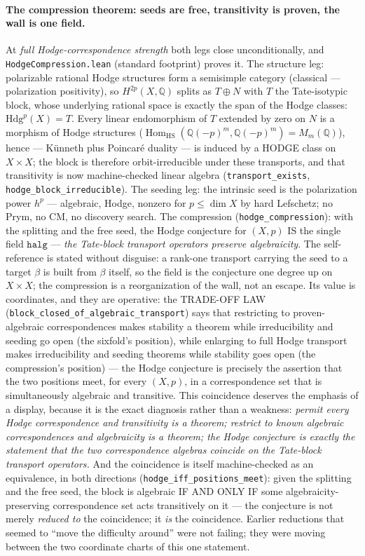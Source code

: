 \documentclass[11pt]{article}
\theoremstyle{definition}
\theoremstyle{remark}
\begin{document}
\paragraph{The compression theorem: seeds are free, transitivity is
proven, the wall is one field.}  At \emph{full Hodge-correspondence
strength} both legs close unconditionally, and
\texttt{HodgeCompression.lean} (standard footprint) proves it.  The
structure leg: polarizable rational Hodge structures form a semisimple
category (classical --- polarization positivity), so
$H^{2p}(X,\mathbb{Q})$ splits as $T\oplus N$ with $T$ the Tate-isotypic
block, whose underlying rational space is exactly the span of the Hodge
classes: $\mathrm{Hdg}^p(X)=T$.  Every linear endomorphism of $T$
extended by zero on $N$ is a morphism of Hodge structures
($\operatorname{Hom}_{\mathrm{HS}}(\mathbb{Q}(-p)^m,\mathbb{Q}(-p)^m)
=M_m(\mathbb{Q})$), hence --- K\"unneth plus Poincar\'e duality --- is
induced by a HODGE class on $X\times X$; the block is therefore
orbit-irreducible under these transports, and that transitivity is now
machine-checked linear algebra (\texttt{transport\_exists},
\texttt{hodge\_block\_irreducible}).  The seeding leg: the intrinsic
seed is the polarization power $h^p$ --- algebraic, Hodge, nonzero for
$p\le\dim X$ by hard Lefschetz; no Prym, no CM, no discovery search.
The compression (\texttt{hodge\_compression}): with the splitting and
the free seed, the Hodge conjecture for $(X,p)$ IS the single field
$\mathtt{halg}$ --- \emph{the Tate-block transport operators preserve
algebraicity}.  The self-reference is stated without disguise: a
rank-one transport carrying the seed to a target $\beta$ is built from
$\beta$ itself, so the field is the conjecture one degree up on
$X\times X$; the compression is a reorganization of the wall, not an
escape.  Its value is coordinates, and they are operative: the
TRADE-OFF LAW (\texttt{block\_closed\_of\_algebraic\_transport})
says that restricting to proven-algebraic correspondences makes
stability a theorem while irreducibility and seeding go open (the
sixfold's position), while enlarging to full Hodge transport makes
irreducibility and seeding theorems while stability goes open (the
compression's position) --- the Hodge conjecture is precisely the
assertion that the two positions meet, for every $(X,p)$, in a
correspondence set that is simultaneously algebraic and transitive.
This coincidence deserves the emphasis of a display, because it is
the exact diagnosis rather than a weakness: \emph{permit every Hodge
correspondence and transitivity is a theorem; restrict to known
algebraic correspondences and algebraicity is a theorem; the Hodge
conjecture is exactly the statement that the two correspondence
algebras coincide on the Tate-block transport operators.}  And the
coincidence is itself machine-checked as an equivalence, in both
directions (\texttt{hodge\_iff\_positions\_meet}): given the splitting
and the free seed, the block is algebraic IF AND ONLY IF some
algebraicity-preserving correspondence set acts transitively on it ---
the conjecture is not merely \emph{reduced to} the coincidence; it
\emph{is} the coincidence.  Earlier reductions that seemed to ``move
the difficulty around'' were not failing; they were moving between the
two coordinate charts of this one statement.
\end{document}
